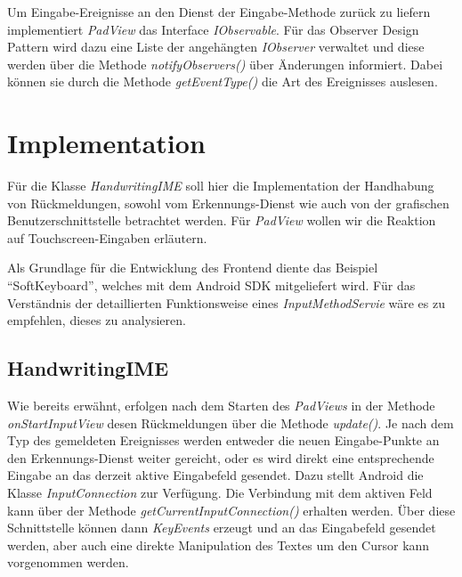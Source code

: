 Um Eingabe-Ereignisse an den Dienst der Eingabe-Methode zurück zu liefern implementiert \emph{PadView} das Interface \emph{IObservable}. Für das Observer Design Pattern wird dazu eine Liste der angehängten \emph{IObserver} verwaltet und diese werden über die Methode \emph{notifyObservers()} über Änderungen informiert. Dabei können sie durch die Methode \emph{getEventType()} die Art des Ereignisses auslesen.

\section{Implementation}

Für die Klasse \emph{HandwritingIME} soll hier die Implementation der Handhabung von Rückmeldungen, sowohl vom Erkennungs-Dienst wie auch von der grafischen Benutzerschnittstelle betrachtet werden. Für \emph{PadView} wollen wir die Reaktion auf Touchscreen-Eingaben erläutern.

Als Grundlage für die Entwicklung des Frontend diente das Beispiel ``SoftKeyboard'', welches mit dem Android SDK mitgeliefert wird. Für das Verständnis der detaillierten Funktionsweise eines \emph{InputMethodServie} wäre es zu empfehlen, dieses zu analysieren.

\subsection{HandwritingIME}

Wie bereits erwähnt, erfolgen nach dem Starten des \emph{PadViews} in der Methode \emph{onStartInputView} desen Rückmeldungen über die Methode \emph{update()}. Je nach dem Typ des gemeldeten Ereignisses werden entweder die neuen Eingabe-Punkte an den Erkennungs-Dienst weiter gereicht, oder es wird direkt eine entsprechende Eingabe an das derzeit aktive Eingabefeld gesendet. Dazu stellt Android die Klasse \emph{InputConnection} zur Verfügung. Die Verbindung mit dem aktiven Feld kann über der Methode \emph{getCurrentInputConnection()} erhalten werden. Über diese Schnittstelle können dann \emph{KeyEvents} erzeugt und an das Eingabefeld gesendet werden, aber auch eine direkte Manipulation des Textes um den Cursor kann vorgenommen werden.


